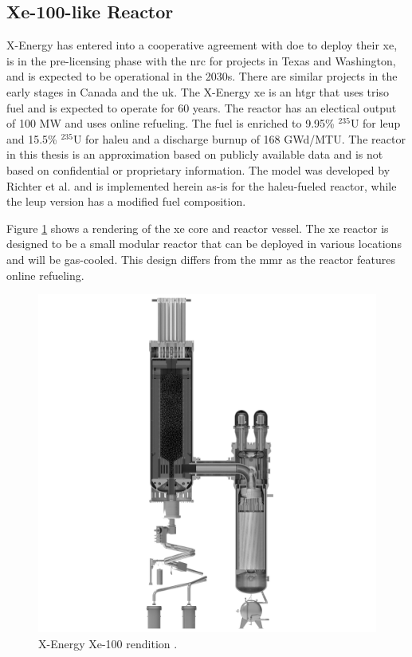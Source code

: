 \subsection{Xe-100-like Reactor}
\label{sec:xe}

X-Energy has entered into a cooperative agreement with \gls{doe} to deploy their \gls{xe}, is in the pre-licensing phase with the \gls{nrc} for projects in Texas and Washington, and is expected to be operational in the 2030s. There are similar projects in the early stages in Canada and the \gls{uk}. The X-Energy \gls{xe} is an \gls{htgr} that uses \gls{triso} fuel and is expected to operate for 60 years. The reactor has an electical output of 100 MW and uses online refueling. The fuel is enriched to 9.95\% $^{235}$U for \gls{leup} and 15.5\% $^{235}$U for \gls{haleu} and a discharge burnup of 168 GWd/MTU. The reactor in this thesis is an approximation based on publicly available data and is not based on confidential or proprietary information. The model was developed by Richter et al. \cite{richter_xe100_like} and is implemented herein as-is for the \gls{haleu}-fueled reactor, while the \gls{leup} version has a modified fuel composition.

Figure \ref{fig:xe_design} shows a rendering of the \gls{xe} core and reactor vessel. The \gls{xe} reactor is designed to be a small modular reactor that can be deployed in various locations and will be gas-cooled. This design differs from the \gls{mmr} as the reactor features online refueling.

\begin{figure}[H]
    \centering
    \includegraphics[scale=0.09]{images/reactor_design/xe-100-reactor-slice.jpg}
    \caption{X-Energy Xe-100 rendition \cite{xe_reactor}.}
    \label{fig:xe_design}
\end{figure}

